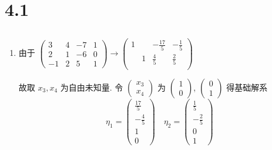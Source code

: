 \section{4.1}
 \subsection{} %
     \paragraph{} %
         \begin{enumerate}
             \item %
                   由于 \( \begin{pmatrix}
                       3  & 4 & -7 & 1 \\
                       2  & 1 & -6 & 0 \\
                       -1 & 2 & 5  & 1
                   \end{pmatrix} \rightarrow \begin{pmatrix}
                       1 &   & -\frac{17}{5} & -\frac{1}{5} \\
                         & 1 & \frac{4}{5}   & \frac{2}{5}  \\
                         &   &               &
                   \end{pmatrix} \)

                   故取 \( x_{3}, x_{4} \) 为自由未知量. 令 \( \begin{pmatrix}
                       x_{3} \\
                       x_{4}
                   \end{pmatrix} \) 为 \( \begin{pmatrix}
                       1 \\
                       0
                   \end{pmatrix} \), \( \begin{pmatrix}
                       0 \\
                       1
                   \end{pmatrix} \) 得基础解系\[ \eta_{1} = \begin{pmatrix}
                           \frac{17}{5} \\
                           -\frac{4}{5} \\
                           1            \\
                           0
                       \end{pmatrix} \quad \eta_{2} = \begin{pmatrix}
                           \frac{1}{5}  \\
                           -\frac{2}{5} \\
                           0            \\
                           1
                       \end{pmatrix} \]


\end{enumerate}
